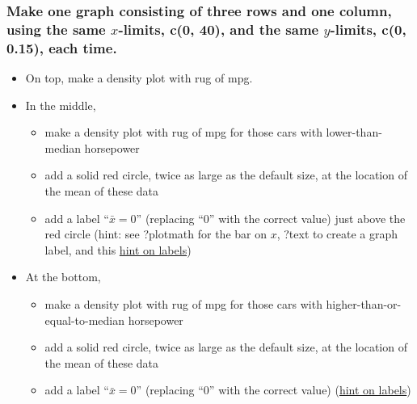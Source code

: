 \documentclass[]{article}
\providecommand{\tightlist}{%
  \setlength{\itemsep}{0pt}\setlength{\parskip}{0pt}}
\begin{document}
\subsubsection{\texorpdfstring{Make one graph consisting of three rows
and one column, using the same \(x\)-limits, c(0, 40), and the same
\(y\)-limits, c(0, 0.15), each
time.}{Make one graph consisting of three rows and one column, using the same x-limits, c(0, 40), and the same y-limits, c(0, 0.15), each time.}}\label{make-one-graph-consisting-of-three-rows-and-one-column-using-the-same-x-limits-c0-40-and-the-same-y-limits-c0-0.15-each-time.}

\begin{itemize}
\tightlist
\item
  On top, make a density plot with rug of mpg.
\item
  In the middle,

  \begin{itemize}
  \tightlist
  \item
    make a density plot with rug of mpg for those cars with
    lower-than-median horsepower
  \item
    add a solid red circle, twice as large as the default size, at the
    location of the mean of these data
  \item
    add a label ``\(\bar{x}=0\)'' (replacing ``0'' with the correct
    value) just above the red circle (hint: see ?plotmath for the bar on
    \(x\), ?text to create a graph label, and this
    \href{label.html}{hint on labels})
  \end{itemize}
\item
  At the bottom,

  \begin{itemize}
  \tightlist
  \item
    make a density plot with rug of mpg for those cars with
    higher-than-or-equal-to-median horsepower
  \item
    add a solid red circle, twice as large as the default size, at the
    location of the mean of these data
  \item
    add a label ``\(\bar{x}=0\)'' (replacing ``0'' with the correct
    value) (\href{label.html}{hint on labels})
  \end{itemize}
\end{itemize}
\end{document}
